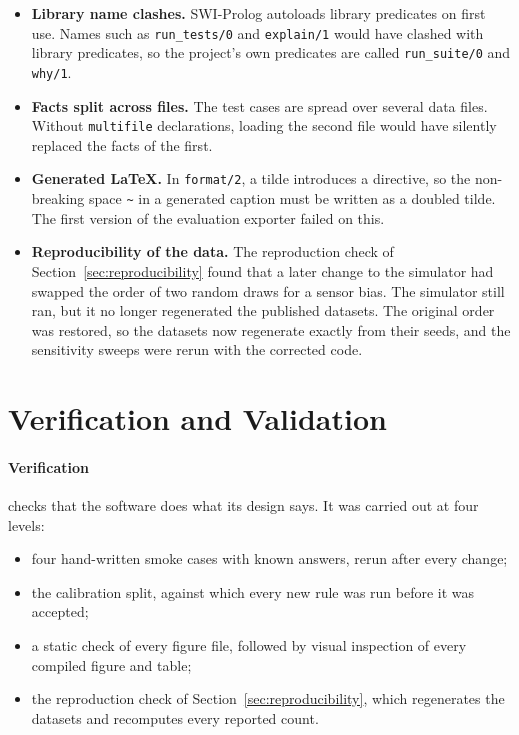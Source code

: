 \begin{itemize}
  \item \textbf{Library name clashes.} SWI-Prolog autoloads library predicates on first use. Names such as \texttt{run\_tests/0} and \texttt{explain/1} would have clashed with library predicates, so the project's own predicates are called \texttt{run\_suite/0} and \texttt{why/1}.
  \item \textbf{Facts split across files.} The test cases are spread over several data files. Without \texttt{multifile} declarations, loading the second file would have silently replaced the facts of the first.
  \item \textbf{Generated LaTeX.} In \texttt{format/2}, a tilde introduces a directive, so the non-breaking space \texttt{\textasciitilde} in a generated caption must be written as a doubled tilde. The first version of the evaluation exporter failed on this.
  \item \textbf{Reproducibility of the data.} The reproduction check of Section~\ref{sec:reproducibility} found that a later change to the simulator had swapped the order of two random draws for a sensor bias. The simulator still ran, but it no longer regenerated the published datasets. The original order was restored, so the datasets now regenerate exactly from their seeds, and the sensitivity sweeps were rerun with the corrected code.
\end{itemize}

\section{Verification and Validation}
\label{sec:vandv}

\paragraph{Verification} checks that the software does what its design says. It was carried out at four levels:
\begin{itemize}
  \item four hand-written smoke cases with known answers, rerun after every change;
  \item the calibration split, against which every new rule was run before it was accepted;
  \item a static check of every figure file, followed by visual inspection of every compiled figure and table;
  \item the reproduction check of Section~\ref{sec:reproducibility}, which regenerates the datasets and recomputes every reported count.
\end{itemize}

